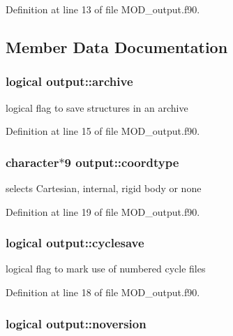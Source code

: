 Definition at line 13 of file M\-O\-D\-\_\-output.\-f90.



\subsection{Member Data Documentation}
\hypertarget{classoutput_a8c613097bea1523e4b41134ef206bf76}{
\subsubsection[{archive}]{\setlength{\rightskip}{0pt plus 5cm}logical output\-::archive}}\label{classoutput_a8c613097bea1523e4b41134ef206bf76}


logical flag to save structures in an archive 



Definition at line 15 of file M\-O\-D\-\_\-output.\-f90.

\hypertarget{classoutput_aae5c9e96b1f9abab3ea8bdc557f4c5d4}{
\subsubsection[{coordtype}]{\setlength{\rightskip}{0pt plus 5cm}character$\ast$9 output\-::coordtype}}\label{classoutput_aae5c9e96b1f9abab3ea8bdc557f4c5d4}


selects Cartesian, internal, rigid body or none 



Definition at line 19 of file M\-O\-D\-\_\-output.\-f90.

\hypertarget{classoutput_ad796e84da751550338170c3d7a890d00}{
\subsubsection[{cyclesave}]{\setlength{\rightskip}{0pt plus 5cm}logical output\-::cyclesave}}\label{classoutput_ad796e84da751550338170c3d7a890d00}


logical flag to mark use of numbered cycle files 



Definition at line 18 of file M\-O\-D\-\_\-output.\-f90.

\hypertarget{classoutput_a853cd8901c51bb24a21f26abe5e0dea5}{
\subsubsection[{noversion}]{\setlength{\rightskip}{0pt plus 5cm}logical output\-::noversion}}\label{classoutput_a853cd8901c51bb24a21f26abe5e0dea5}


